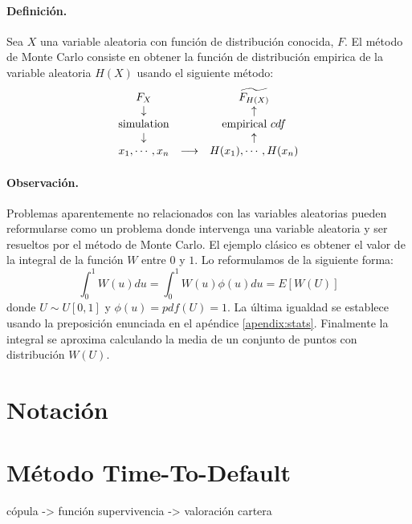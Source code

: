 \paragraph{Definici\'on.} Sea $X$ una variable aleatoria con funci\'on de 
distribuci\'on conocida, $F$. El m\'etodo de Monte Carlo consiste en 
obtener la funci\'on de distribuci\'on empirica de la variable aleatoria 
$H(X)$ usando el siguiente m\'etodo:
\begin{displaymath}
\begin{array}{ccc}
F_X                  &     \quad         & \widetilde{F_{H(X)}}   \cr
\downarrow         &     \quad         & \uparrow                \cr
\textrm{simulation} &     \quad         & \textrm{empirical } cdf \cr
\downarrow         &     \quad         & \uparrow                \cr
x_1,\cdots,x_n      & \longrightarrow & H(x_1),\cdots,H(x_n)  
\end{array}
\end{displaymath}

\paragraph{Observaci\'on.} Problemas aparentemente no relacionados con las 
variables aleatorias pueden reformularse como un problema donde intervenga
una variable aleatoria y ser resueltos por el m\'etodo de Monte Carlo. El 
ejemplo cl\'asico es obtener el valor de la integral de la funci\'on $W$ entre 
$0$ y $1$. Lo reformulamos de la siguiente forma:
\begin{displaymath}
\int_{0}^{1} W(u) du = \int_{0}^{1} W(u) \phi(u) du = E[W(U)]
\end{displaymath}
donde $U \sim U[0,1]$ y $\phi(u) = pdf(U) = 1$. La \'ultima igualdad se establece 
usando la preposici\'on enunciada en el ap\'endice \ref{apendix:stats}. 
Finalmente la integral se aproxima calculando la media de un conjunto de puntos 
con distribuci\'on $W(U)$.



\section{Notaci\'on}


\section{M\'etodo Time-To-Default}
c\'opula -> funci\'on supervivencia -> valoraci\'on cartera

